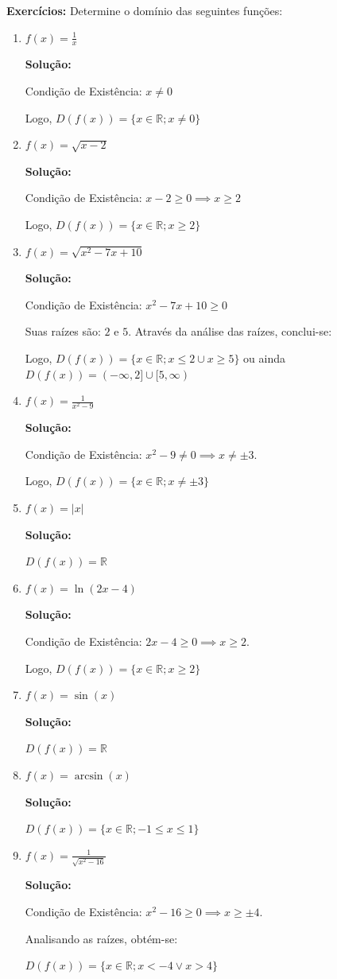 \documentclass[oneside,a4paper,12pt]{article}
\begin{document}
\textbf{Exercícios: }Determine o domínio das seguintes funções:
\begin{enumerate}

\item $f(x) = \frac{1}{x}$

{\bf Solução:}

Condição de Existência: $x \neq 0$

Logo, $D(f(x)) = \{ x \in \mathbb{R}; x \neq 0\}$

\item $f(x) = \sqrt{x-2}$

{\bf Solução:}

Condição de Existência: $x - 2 \geq 0 \implies x \geq 2$

Logo, $D(f(x)) = \{ x \in \mathbb{R}; x \geq 2 \}$

\item $f(x) = \sqrt{x^2 - 7x + 10}$

{\bf Solução:}

Condição de Existência: $x^2 - 7x + 10 \geq 0$

Suas raízes são: $2$ e $5$. Através da análise das raízes, conclui-se:

Logo, $D(f(x)) = \{ x \in \mathbb{R}; x \leq 2 \cup x \geq 5 \}$ ou ainda $D(f(x)) = (-\infty,2]\cup[5,\infty)$

\item $f(x) = \frac{1}{x^2 - 9}$

{\bf Solução:}

Condição de Existência: $x^2 - 9 \neq 0 \implies x \neq \pm 3$.

Logo, $D(f(x)) = \{ x \in \mathbb{R}; x \neq \pm 3 \}$

\item $f(x) = |x|$

{\bf Solução:}

$D(f(x)) = \mathbb{R}$

\item $f(x) = \ln(2x - 4)$

{\bf Solução:}

Condição de Existência: $2x - 4 \geq 0 \implies x \geq 2$.

Logo, $D(f(x)) = \{ x \in \mathbb{R}; x \geq 2 \}$

\item $f(x) = \sin(x)$

{\bf Solução:}

$D(f(x)) = \mathbb{R}$

\item $f(x) = \arcsin(x)$

{\bf Solução:}

$D(f(x)) = \{ x \in \mathbb{R}; -1\leq x \leq 1 \}$

\item $f(x) = \frac{1}{\sqrt{x^2 - 16}}$

{\bf Solução:}

Condição de Existência: $x^2 - 16 \geq 0 \implies x \geq \pm 4$.

Analisando as raízes, obtém-se:

$D(f(x)) = \{ x \in \mathbb{R}; x < -4 \lor x > 4 \}$

\end{enumerate}
\end{document}

